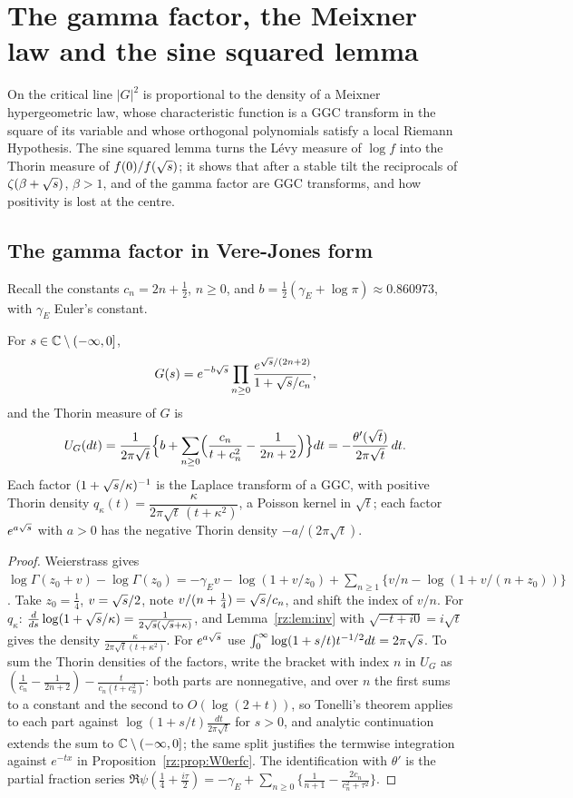 \section{The gamma factor, the Meixner law and the sine squared lemma}\label{ch:rz2}

On the critical line $|G|^2$ is proportional to the density of a Meixner hypergeometric law, whose characteristic function is a GGC transform in the square of its variable and whose orthogonal polynomials satisfy a local Riemann Hypothesis. The sine squared lemma turns the L\'evy measure of $\log f$ into the Thorin measure of $f(0)/f(\sqrt{s})$; it shows that after a stable tilt the reciprocals of $\zeta(\beta+\sqrt{s})$, $\beta>1$, and of the gamma factor are GGC transforms, and how positivity is lost at the centre.

\subsection{The gamma factor in Vere-Jones form}\label{rz:sec:gamma}

Recall the constants $c_n=2n+\frac12$, $n\ge0$, and $b=\frac12(\gamma_E+\log\pi)\approx0.860973$, with $\gamma_E$ Euler's constant.

\begin{theorem}\label{rz:thm:gamma}
For $s\in\mathbb{C}\setminus(-\infty,0]$,
\[
G(s)=e^{-b\sqrt{s}}\prod_{n\ge0}\frac{e^{\sqrt{s}/(2n+2)}}{1+\sqrt{s}/c_n},
\]
and the Thorin measure of $G$ is
\[
U_G(dt)=\frac{1}{2\pi\sqrt t}\Bigl\{b+\sum_{n\ge0}\Bigl(\frac{c_n}{t+c_n^2}-\frac{1}{2n+2}\Bigr)\Bigr\}dt=-\frac{\theta'(\sqrt t)}{2\pi\sqrt t}\,dt .
\]
Each factor $(1+\sqrt{s}/\kappa)^{-1}$ is the Laplace transform of a GGC, with positive Thorin density $q_\kappa(t)=\dfrac{\kappa}{2\pi\sqrt t\,(t+\kappa^2)}$, a Poisson kernel in $\sqrt t$; each factor $e^{a\sqrt{s}}$ with $a>0$ has the negative Thorin density $-a/(2\pi\sqrt t)$.
\end{theorem}

\begin{proof}
Weierstrass gives $\log\Gamma(z_0+v)-\log\Gamma(z_0)=-\gamma_Ev-\log(1+v/z_0)+\sum_{n\ge1}\{v/n-\log(1+v/(n+z_0))\}$. Take $z_0=\frac14$, $v=\sqrt{s}/2$, note $v/(n+\frac14)=\sqrt{s}/c_n$, and shift the index of $v/n$. For $q_\kappa$: $\frac{d}{ds}\log(1+\sqrt{s}/\kappa)=\frac{1}{2\sqrt{s}(\sqrt{s}+\kappa)}$, and Lemma~\ref{rz:lem:inv} with $\sqrt{-t+i0}=i\sqrt t$ gives the density $\frac{\kappa}{2\pi\sqrt t(t+\kappa^2)}$. For $e^{a\sqrt{s}}$ use $\int_0^\infty\log(1+s/t)t^{-1/2}dt=2\pi\sqrt{s}$. To sum the Thorin densities of the factors, write the bracket with index $n$ in $U_G$ as $(\frac1{c_n}-\frac1{2n+2})-\frac{t}{c_n(t+c_n^2)}$: both parts are nonnegative, and over $n$ the first sums to a constant and the second to $O(\log(2+t))$, so Tonelli's theorem applies to each part against $\log(1+s/t)\frac{dt}{2\pi\sqrt t}$ for $s>0$, and analytic continuation extends the sum to $\mathbb{C}\setminus(-\infty,0]$; the same split justifies the termwise integration against $e^{-tx}$ in Proposition~\ref{rz:prop:W0erfc}. The identification with $\theta'$ is the partial fraction series $\Re\psi(\frac14+\frac{i\tau}2)=-\gamma_E+\sum_{n\ge0}\{\frac1{n+1}-\frac{2c_n}{c_n^2+\tau^2}\}$.
\end{proof}

